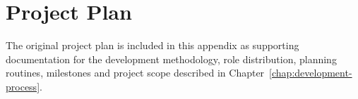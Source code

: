 \chapter{Project Plan}
\label{app:project-plan}

The original project plan is included in this appendix as supporting documentation for the development methodology, role distribution, planning routines, milestones and project scope described in Chapter~\ref{chap:development-process}.

